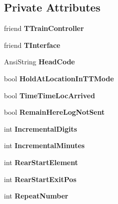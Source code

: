 \subsection*{Private Attributes}
\begin{DoxyCompactItemize}
\item 
\mbox{\label{class_t_train_abb385030108fe96cdcd550b2aa2072a7}} 
friend {\bfseries T\+Train\+Controller}
\item 
\mbox{\label{class_t_train_a0dd5144abd7dbc49a714d6c2e4cc1851}} 
friend {\bfseries T\+Interface}
\item 
\mbox{\label{class_t_train_a68f4b62f3405f80d58f33519392ab37e}} 
Ansi\+String {\bfseries Head\+Code}
\item 
\mbox{\label{class_t_train_a8f90e7446fd72ae99641a7ca9ee76ab6}} 
bool {\bfseries Hold\+At\+Location\+In\+T\+T\+Mode}
\item 
\mbox{\label{class_t_train_a4bfd087e177535b7e3086393c09e40a6}} 
bool {\bfseries Time\+Time\+Loc\+Arrived}
\item 
\mbox{\label{class_t_train_a52721f222fff0b6e08fffe94d693ac65}} 
bool {\bfseries Remain\+Here\+Log\+Not\+Sent}
\item 
\mbox{\label{class_t_train_a7390e5172ab0a5aa998df94953e43fba}} 
int {\bfseries Incremental\+Digits}
\item 
\mbox{\label{class_t_train_a8601120683e9bf4f26b0d1cba75ceed4}} 
int {\bfseries Incremental\+Minutes}
\item 
\mbox{\label{class_t_train_a17d0d896f438220698e0b2b47e5112da}} 
int {\bfseries Rear\+Start\+Element}
\item 
\mbox{\label{class_t_train_a469298d2fbbd846e2a62e7a04cfedc34}} 
int {\bfseries Rear\+Start\+Exit\+Pos}
\item 
\mbox{\label{class_t_train_a459ae11b674cfdccb8872ef25c921fd9}} 
int {\bfseries Repeat\+Number}
\item 

\end{DoxyCompactItemize}

